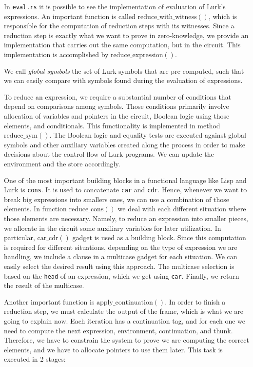 \documentclass[10pt, english]{article}
\newcommand{\redexp}{\mathrm{reduce\_expression}}
\newcommand{\redwithwit}{\mathrm{reduce\_with\_witness}}
\newcommand{\redcons}{\mathrm{reduce\_cons}}
\newcommand{\redsym}{\mathrm{reduce\_sym}}
\newcommand{\applycont}{\mathrm{apply\_continuation}}
\newcommand{\carcdr}{\mathrm{car\_cdr}}
\begin{document}
In \verb|eval.rs| it is possible to see the implementation of evaluation of Lurk's expressions. An important function is called $\redwithwit()$, which is responsible for the computation of reduction steps with its witnesses. Since a reduction step is exactly what we want to prove in zero-knowledge, we provide an implementation that carries out the same computation, but in the circuit. This implementation is accomplished by $\redexp()$.

We call \textit{global symbols} the set of Lurk symbols that are pre-computed, such that we can easily compare with symbols found during the evaluation of expressions.

To reduce an expression, we require a substantial number of conditions that depend on comparisons among symbols. Those conditions primarily involve allocation of variables and pointers in the circuit, Boolean logic using those elements, and conditionals. This functionality is implemented in method $\redsym()$. The Boolean logic and equality tests are executed against global symbols and other auxiliary variables created along the process in order to make decisions about the control flow of Lurk programs. We can update the environment and the store accordingly.

One of the most important building blocks in a functional language like Lisp and Lurk is \verb|cons|. It is used to concatenate \verb|car| and \verb|cdr|. Hence, whenever we want to break big expressions into smallers ones, we can use a combination of those elements. In function $\redcons()$ we deal with each different situation where those elements are necessary. Namely, to reduce an expression into smaller pieces, we allocate in the circuit some auxiliary variables for later utilization. In particular, $\carcdr()$ gadget is used as a building block. Since this computation is required for different situations, depending on the type of expression we are handling, we include a clause in a multicase gadget for each situation. We can easily select the desired result using this approach. The multicase selection is based on the \verb|head| of an expression, which we get using \verb|car|. Finally, we return the result of the multicase.

Another important function is $\applycont()$. In order to finish a reduction step, we must calculate the output of the frame, which is what we are going to explain now. Each iteration has a continuation tag, and for each one we need to compute the next expression, environment, continuation, and thunk. Therefore, we have to constrain the system to prove we are computing the correct elements, and we have to allocate pointers to use them later. This task is executed in 2 stages:
\end{document}
